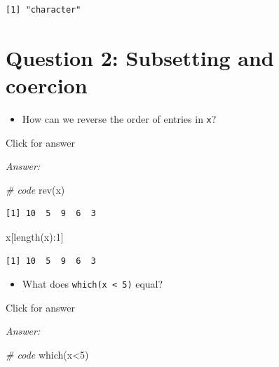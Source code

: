 \documentclass[
]{book}
\newenvironment{Shaded}{\begin{snugshade}}{\end{snugshade}}
\newcommand{\CommentTok}[1]{\textcolor[rgb]{0.56,0.35,0.01}{\textit{#1}}}
\newcommand{\DecValTok}[1]{\textcolor[rgb]{0.00,0.00,0.81}{#1}}
\newcommand{\FunctionTok}[1]{\textcolor[rgb]{0.00,0.00,0.00}{#1}}
\newcommand{\NormalTok}[1]{#1}
\newcommand{\SpecialCharTok}[1]{\textcolor[rgb]{0.00,0.00,0.00}{#1}}
\providecommand{\tightlist}{%
  \setlength{\itemsep}{0pt}\setlength{\parskip}{0pt}}
\begin{document}
\begin{verbatim}
[1] "character"
\end{verbatim}

\hypertarget{question-2-subsetting-and-coercion}{%
\section{Question 2: Subsetting and coercion}\label{question-2-subsetting-and-coercion}}

\begin{itemize}
\tightlist
\item
  How can we reverse the order of entries in \texttt{x}?
\end{itemize}

Click for answer

\emph{Answer:}

\begin{Shaded}
\begin{Highlighting}[]
\CommentTok{\# code}
\FunctionTok{rev}\NormalTok{(x)}
\end{Highlighting}
\end{Shaded}

\begin{verbatim}
[1] 10  5  9  6  3
\end{verbatim}

\begin{Shaded}
\begin{Highlighting}[]
\NormalTok{x[}\FunctionTok{length}\NormalTok{(x)}\SpecialCharTok{:}\DecValTok{1}\NormalTok{]}
\end{Highlighting}
\end{Shaded}

\begin{verbatim}
[1] 10  5  9  6  3
\end{verbatim}

\begin{itemize}
\tightlist
\item
  What does \texttt{which(x\ \textless{}\ 5)} equal?
\end{itemize}

Click for answer

\emph{Answer:}

\begin{Shaded}
\begin{Highlighting}[]
\CommentTok{\# code}
\FunctionTok{which}\NormalTok{(x}\SpecialCharTok{\textless{}}\DecValTok{5}\NormalTok{)}
\end{Highlighting}
\end{Shaded}
\end{document}
